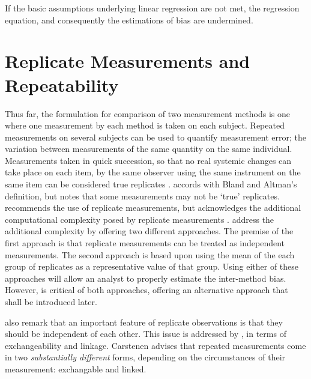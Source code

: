 \documentclass[12pt, a4paper]{report}
\theoremstyle{plain}
\theoremstyle{definition}
\theoremstyle{remark}
\begin{document}
	
		If the basic assumptions underlying linear regression are not met, the regression equation, and consequently the estimations of bias are undermined. 
		

	\section{Replicate Measurements and Repeatability}
Thus far, the formulation for comparison of two measurement
methods is one where one measurement by each method is taken on
each subject. Repeated measurements on several subjects can be used to quantify measurement error; the variation between measurements of the same quantity on the same individual. Measurements taken in quick succession, so that no real systemic changes can take place on each item,  by the same observer using the same instrument on the same item can be considered true replicates \citep{BA99}. \citet{ARoy2009} accords with Bland and Altman's definition, but notes that some measurements may not be `true' replicates.
 \citet{BXC2008} recommends the use of replicate measurements, but acknowledges the additional computational complexity posed by replicate measurements . \citet*{BA86} address the additional complexity by offering two different approaches. The premise of the first approach is that replicate measurements can be treated as independent measurements. The second approach is based upon using the mean of the each group of
		replicates as a representative value of that group. Using either of these approaches will allow an analyst to properly estimate the inter-method bias. However, \citet{BXC2008} is critical of both approaches, offering an alternative approach that shall be introduced later.
		
\citet{BA99} also remark that an important feature of replicate observations is that they should be independent
of each other. This issue is addressed by \citet{BXC2010}, in terms of exchangeability and linkage. Carstenen advises that repeated measurements come in two \emph{substantially different} forms, depending on the circumstances of their measurement: exchangable and linked.
		
%		
%		
%	
	
%	
	
\end{document}
